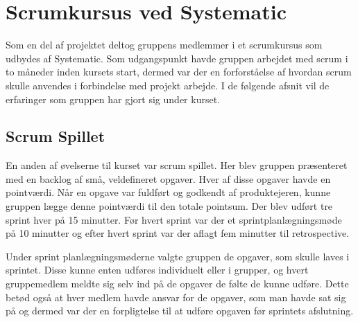\chapter{Scrumkursus ved Systematic}
Som en del af projektet deltog gruppens medlemmer i et scrumkursus som udbydes af Systematic. Som udgangspunkt havde gruppen arbejdet med scrum i to måneder inden kursets start, dermed var der en forforståelse af hvordan scrum skulle anvendes i forbindelse med projekt arbejde. I de følgende afsnit vil de erfaringer som gruppen har gjort sig under kurset.


\section{Scrum Spillet}
En anden af øvelserne til kurset var scrum spillet. Her blev gruppen præsenteret med en backlog af små, veldefineret opgaver. Hver af disse opgaver havde en pointværdi. Når en opgave var fuldført og godkendt af produktejeren, kunne gruppen lægge denne pointværdi til den totale pointsum. Der blev udført tre sprint hver på 15 minutter. Før hvert sprint var der et sprintplanlægningsmøde på 10 minutter og efter hvert sprint var der aflagt fem minutter til retrospective. \newline

Under sprint planlægningsmøderne valgte gruppen de opgaver, som skulle laves i sprintet. Disse kunne enten udføres individuelt eller i grupper, og hvert gruppemedlem meldte sig selv ind på de opgaver de følte de kunne udføre. Dette betød også at hver medlem havde ansvar for de opgaver, som man havde sat sig på og dermed var der en forpligtelse til at udføre opgaven før sprintets afslutning. \newline

